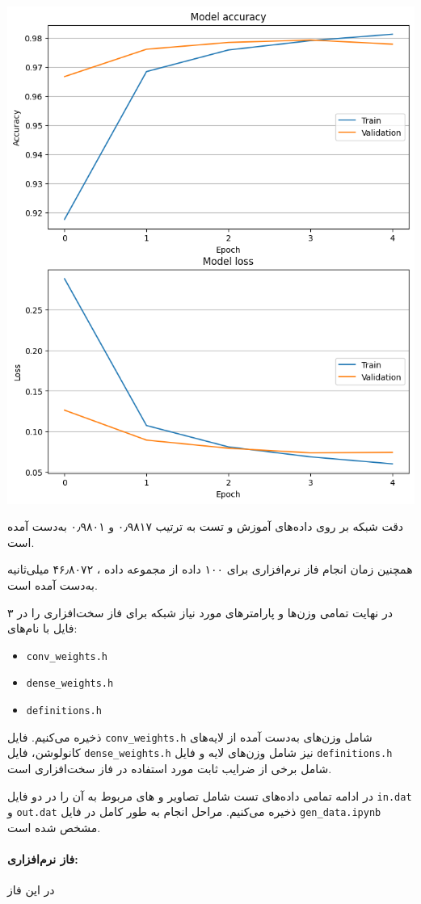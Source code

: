 \begin{qsolve}
	\begin{center}
		\includegraphics*[width=0.7\linewidth]{pics/img4.png}
		\label{نمودارهای Loss و Accuracy}
	\end{center}
	
	دقت شبکه بر روی داده‌های آموزش و تست به ترتیب ۰٫۹۸۱۷ و ۰٫۹۸۰۱ به‌دست آمده است.
	
	همچنین زمان انجام فاز  نرم‌افزاری برای ۱۰۰ داده از مجموعه داده ، ۴۶٫۸۰۷۲ میلی‌ثانیه به‌دست آمده است.
	
	در نهایت تمامی وزن‌ها و پارامتر‌های مورد نیاز شبکه برای فاز سخت‌افزاری را در ۳ فایل با نام‌های:
	
	\begin{latin}
		\begin{itemize}
			\item 
			\texttt{conv\_weights.h}
			
			\item 
			\texttt{dense\_weights.h}
			
			\item 
			\texttt{definitions.h}
		\end{itemize}
	\end{latin}
	
	ذخیره می‌کنیم. فایل \texttt{conv\_weights.h} شامل وزن‌های به‌دست آمده از لایه‌های کانولوشن، فایل \texttt{dense\_weights.h} نیز شامل وزن‌های لایه  و فایل \texttt{definitions.h} شامل برخی از ضرایب ثابت مورد استفاده در فاز سخت‌افزاری است.
	
	در ادامه تمامی داده‌های تست  شامل تصاویر و  های مربوط به آن را در دو فایل \texttt{in.dat} و \texttt{out.dat} ذخیره می‌کنیم. مراحل انجام به طور کامل در فایل \texttt{gen\_data.ipynb} مشخص شده است.

\end{qsolve}



\begin{qsolve}
	\paragraph{فاز نرم‌افزاری:}
	
	در این فاز
\end{qsolve}





